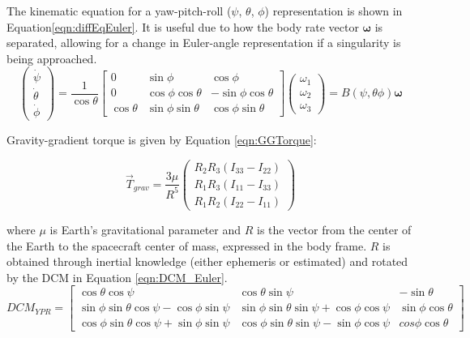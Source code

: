 \documentclass[]{aiaa-tc}%
\begin{document}
The kinematic equation for a yaw-pitch-roll ($\psi$, $\theta$, $\phi$) representation is shown in Equation\ref{eqn:diffEqEuler}\cite{SchaubJunkins}. It is useful due to how the body rate vector $\boldsymbol{\omega}$ is separated, allowing for a change in Euler-angle representation if a singularity is being approached.
	\begin{equation}		
		\begin{pmatrix}
		\dot{\psi}\\ 
		\dot{\theta}\\ 
		\dot{\phi}
		\end{pmatrix} = 
		\frac{1}{\cos \theta}\begin{bmatrix}
		0 & \sin\phi & \cos\phi \\ 
		0 & \cos\phi\cos\theta & -\sin\phi\cos\theta\\ 
		\cos \theta & \sin\phi\sin\theta & \cos\phi\sin\theta
		\end{bmatrix}
		\begin{pmatrix}
		\omega_1\\ 
		\omega_2\\ 
		\omega_3
		\end{pmatrix}=
		B(\psi,\theta\phi)\boldsymbol{\omega}
		\label{eqn:diffEqEuler}
	\end{equation}

Gravity-gradient torque is given by Equation \ref{eqn:GGTorque}\cite{SchaubJunkins}:

	\begin{equation}
		\vec{T}_{grav} = \frac{3\mu}{R^5}\begin{pmatrix}
		R_2R_3(I_{33}-I_{22})\\ 
		R_1R_3(I_{11}-I_{33})\\ 
		R_1R_2(I_{22}-I_{11})
		\end{pmatrix}
		\label{eqn:GGTorque}
	\end{equation}

\noindent where $\mu$ is Earth's gravitational parameter and $R$ is the vector from the center of the Earth to the spacecraft center of mass, expressed in the body frame. $R$ is obtained through inertial knowledge (either ephemeris or estimated) and rotated by the DCM in Equation \ref{eqn:DCM_Euler}.
	\begin{equation}
		DCM_{YPR} = \begin{bmatrix}
		\cos\theta\cos\psi & \cos\theta\sin\psi & -\sin\theta\\ 
		\sin\phi\sin\theta\cos\psi -\cos\phi\sin\psi& \sin\phi\sin\theta\sin\psi+\cos\phi\cos\psi & \sin\phi\cos\theta\\ 
		\cos\phi\sin\theta\cos\psi+\sin\phi\sin\psi & \cos\phi\sin\theta\sin\psi-\sin\phi\cos\psi & cos\phi\cos\theta
		\end{bmatrix}
		\label{eqn:DCM_Euler}
	\end{equation}
\end{document}

